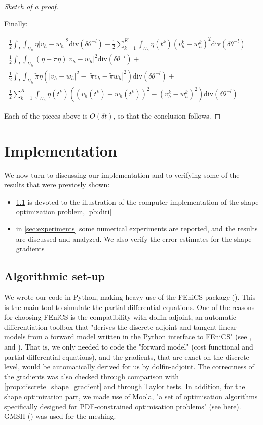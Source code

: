 \documentclass[english,a4paper,9pt,oneside]{scrbook}	%
\theoremstyle{break}
\newenvironment{mproof}[1][\proofname]{%
  \begin{proof}[#1]$ $\par\nobreak\ignorespaces
}{%
  \end{proof}
}
\renewcommand*{\proofname}{Proof}
\theoremstyle{remark}
\newcommand{\te}{\theta}
\newcommand{\dive}{\text{div}}
\begin{document}
\begin{mproof}[Sketch of a proof]
Finally:

\begin{align*}
	\frac{1}{2} \int_I \int_{U_h} \eta |v_h-w_h|^2\dive(\delta \te^{-l}) - \frac{1}{2} \sum_{k=1}^K \int_{U_h}\eta(t^k)(v_h^k-w_h^k)^2\dive(\delta \te^{-l}) = \\
	\frac{1}{2} \int_I \int_{U_h} (\eta-\tilde{\pi}\eta) |v_h-w_h|^2\dive(\delta \te^{-l})+\\
	\frac{1}{2} \int_I \int_{U_h} \tilde{\pi} \eta (|v_h-w_h|^2 - |\tilde{\pi} v_h-\tilde{\pi}w_h|^2)\dive(\delta \te^{-l})+\\
	\frac{1}{2} \sum_{k=1}^K \int_{U_h}\eta(t^k)((v_h(t^k)-w_h(t^k))^2-(v_h^k-w_h^k)^2)\dive(\delta \te^{-l})
\end{align*}

Each of the pieces above is $O(\delta t)$, so that the conclusion follows.

\end{mproof}

\chapter{Implementation}
\label{chap:num_exp}

We now turn to discussing our implementation and to verifying some of the results that were previosly shown:

\begin{itemize}
	\item \cref{sec:implementation} is devoted to the illustration of the computer implementation of the shape optimization problem, \cref{pb:diri}
	\item in \cref{sec:experiments} some numerical experiments are reported, and the results are discussed and analyzed. We also verify the error estimates for the shape gradients
\end{itemize}

\section{Algorithmic set-up}
\label{sec:implementation}

We wrote our code in Python, making heavy use of the FEniCS package (\cite{fenics}). This is the main tool to simulate the partial differential equations. One of the reasons for choosing FEniCS is the compatibility with dolfin-adjoint, an automatic differentiation toolbox that "derives the discrete adjoint and tangent linear models from a forward model written in the Python interface to FEniCS" (see \cite{dolfin-adjoint_1}, \cite{dolfin-adjoint_2} and \cite{dolfin-adjoint_3}). That is, we only needed to code the "forward model" (cost functional and partial differential equations), and the gradients, that are exact on the discrete level, would be automatically derived for us by dolfin-adjoint. The correctness of the gradients was also checked through comparison with \cref{prop:discrete_shape_gradient} and through Taylor tests. In addition, for the shape optimization part, we made use of Moola, "a set of optimisation algorithms specifically designed for PDE-constrained optimisation problems" (see \href{https://github.com/funsim/moola}{here}). GMSH (\cite{gmsh}) was used for the meshing.
\end{document}
